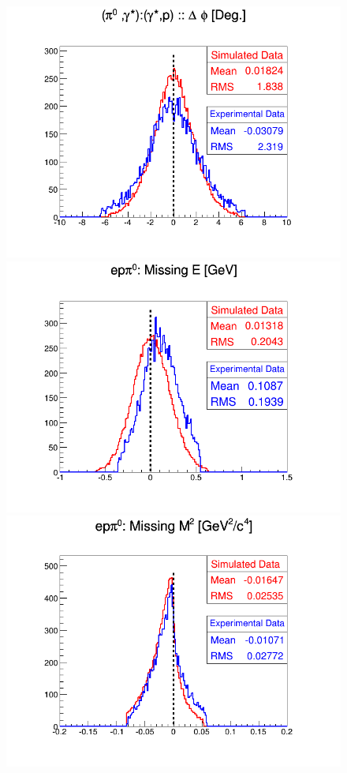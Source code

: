 \begin{figure}[h!]
\includegraphics[scale=0.35]{fig_dvcs/comp/InCoh_pi0_delta_phi_InCoh.png}
\includegraphics[scale=0.35]{fig_dvcs/comp/InCoh_pi0_eppi0_E_Mis.png}
\includegraphics[scale=0.35]{fig_dvcs/comp/InCoh_pi0_eppi0_M2_Mis.png}

\end{figure}

